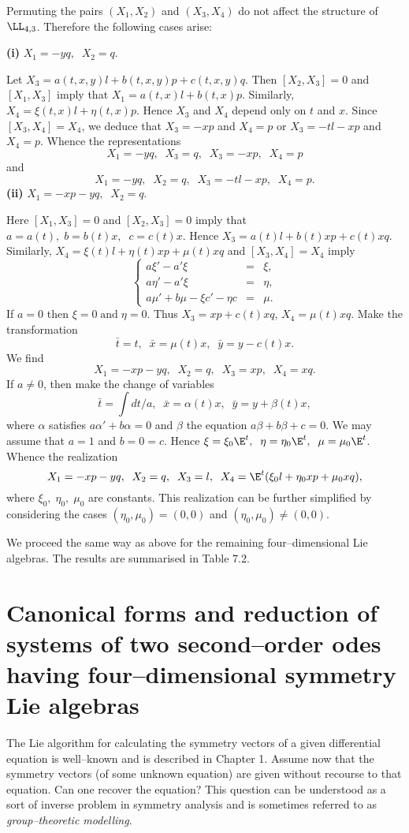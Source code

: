 Permuting the pairs $(X_1,X_2)$ and
$(X_3,X_4)$ do not affect the structure of $\LL_{4,3}$. Therefore the
following cases arise:

{\bf (i)} $X_1=-yq,\;\;X_2=q.$

Let $X_3=a(t,x,y)l+b(t,x,y)p+ c(t,x,y)q$. Then $[X_2,X_3]=0 $ and $[X_1,X_3]$
imply that $X_1=a(t,x)l+b(t,x)p$. Similarly, $X_4=\xi (t,x)l+\eta (t,x) p
$. Hence $X_3$ and $X_4$ depend only on $t$ and $x$. Since
$[X_3,X_4]=X_4$, we deduce that $X_3=-xp $ and $X_4=p$ or $X_3=-tl-xp$ and
$X_4=p$. Whence the representations \[
X_1=-yq,\;\;X_3=q,\;\;X_3=-xp,\;\;X_4=p\] and
\[X_1=-yq,\;\;X_2=q,\;\;X_3=-tl-xp,\;\;X_4=p.\]
{\bf (ii)} $X_1=-xp-yq,\;\;X_2=q.$

Here $[X_1,X_3]=0$ and $[X_2,X_3]=0$ imply that $
a=a(t),\;b=b(t)x,\;\;c=c(t)x$. Hence $X_3=a(t)l+b(t)xp+c(t)xq$. Similarly,
$X_4=\xi (t)l+\eta (t)xp+\mu (t)xq$ and  $[X_3,X_4]=X_4$ imply \[\left \{
\begin{array}{lll} a\xi '-a'\xi & = & \xi,\\ a\eta '-a'\xi & = & \eta, \\
a\mu '+b\mu  -\xi c'-\eta c & = & \mu . \end{array} \right. \] If $ a=0$
then $\xi=0\;\mbox{and}\;\eta =0$. Thus  $X_3=xp+c(t)xq$, $X_4=\mu (t)xq$.
Make the transformation \[\bar t= t,\;\; \bar x= \mu (t)x,\;\;\bar y
=y-c(t)x.\]
We find
\[X_1=-xp-yq,\;\;X_2=q,\;\;X_3=xp,\;\;X_4=xq.\] If $a\ne 0$, then 
make the change of variables \[\bar t =\int dt/a,\;\;\bar x = \alpha
(t)x,\;\;\bar y=y+\beta (t)x,\] where  $\alpha$ satisfies $ a\alpha
'+b\alpha=0$ and $\beta$ the equation $a\beta+b\beta+c=0$. We may assume that
$a=1$ and $b=0=c$. Hence $\xi=\xi_0 \E^t,\;\;
\eta=\eta_0\E^t,\;\;\mu=\mu_0\E^t$. Whence the realization
\[X_1=-xp-yq,\;\; X_2=q,\;\;X_3=l,\;\;X_4=\E^t(\xi_0 l+\eta_0 xp+\mu_0
xq),\] where $\xi_0,\;\eta_0,\;\mu_0$ are constants. This  realization can
be further simplified  by considering the cases $(\eta_0,\mu_0)=(0,0)$ and
$(\eta_0,\mu_0)\ne (0,0)$.

We proceed the same way as above for the remaining four--dimensional
Lie algebras. The results are summarised in Table 7.2.

\section{Canonical forms and reduction of systems of two second--order
odes having four--dimensional symmetry Lie algebras}

The Lie algorithm for calculating 
the symmetry vectors of a given differential equation is well--known
and is described in Chapter 1.
Assume now that the symmetry vectors (of some
unknown equation) are given without recourse to that equation. Can one recover the equation?  This  
question can be understood as a sort of inverse problem in symmetry 
analysis and is sometimes referred to as {\em group--theoretic modelling}.

